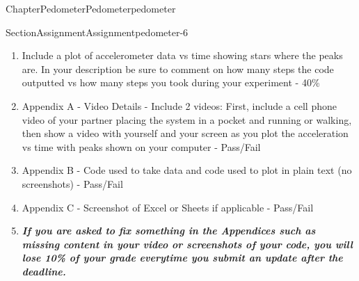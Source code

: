 \documentclass[oneside,10pt,]{book}
\newcommand{\alert}[1]{\textbf{\textit{#1}}}
\numberwithin{equation}{section}
\begin{document}
\begin{chapterptx}{Chapter}{Pedometer}{}{Pedometer}{}{}{pedometer}
\begin{sectionptx}{Section}{Assignment}{}{Assignment}{}{}{pedometer-6}
\begin{introduction}{}
\begin{enumerate}
\item{}Include a plot of accelerometer data vs time showing stars where the peaks are. In your description be sure to comment on how many steps the code outputted vs how many steps you took during your experiment - 40\%%
\item{}Appendix A - Video Details - Include 2 videos: First, include a cell phone video of your partner placing the system in a pocket and running or walking, then show a video with yourself and your screen as you plot the acceleration vs time with peaks shown on your computer - Pass\slash{}Fail%
\item{}Appendix B - Code used to take data and code used to plot in plain text (no screenshots) - Pass\slash{}Fail%
\item{}Appendix C - Screenshot of Excel or Sheets if applicable - Pass\slash{}Fail%
\item{}\alert{If you are asked to fix something in the Appendices such as missing content in your video or screenshots of your code, you will lose 10\% of your grade everytime you submit an update after the deadline.}%
\end{enumerate}
\end{introduction}%
\end{sectionptx}
\end{chapterptx}
%
%
\typeout{************************************************}
\typeout{************************************************}
%
\end{document}
